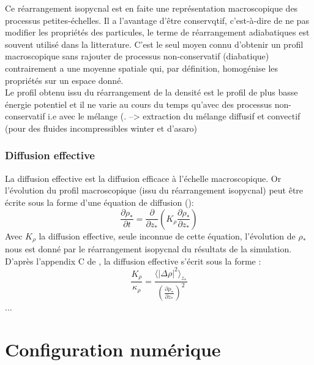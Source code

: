 \documentclass[a4paper,12pt]{article}
\begin{document}
        Ce réarrangement isopycnal est en faite une représentation macroscopique des processus petites-échelles. Il a l'avantage d'être conservqtif, c'est-à-dire de ne pas modifier les propriétés des particules, le terme de réarrangement adiabatiques est souvent utilisé dans la litterature. C'est le seul moyen connu d'obtenir un profil macroscopique sans rajouter de processus non-conservatif (diabatique) contrairement a une moyenne spatiale qui, par définition, homogénise les propriétés sur un espace donné. \\
        Le profil obtenu issu du réarrangement de la densité est le profil de plus basse énergie potentiel et il ne varie au cours du temps qu'avec des processus non-conservatif i.e avec le mélange (\cite*{winters_diascalar_1996}. --> extraction du mélange diffusif et convectif (pour des fluides incompressibles winter et d'asaro)
        
        
        \subsubsection{Diffusion effective}
        
        La diffusion effective est la diffusion efficace à l'échelle macroscopique. Or l'évolution du profil macroscopique (issu du réarrangement isopycnal) peut être écrite sous la forme d'une équation de diffusion (\citep{penney_diapycnal_2020-1}): 
        \begin{equation}
            \label{rho*}
            \frac{\partial\rho_*}{\partial t}=\frac{\partial}{\partial z_*}(K_{\rho}\frac{\partial\rho_*}{\partial z_*})
        \end{equation}
        Avec $K_{\rho}$ la diffusion effective, seule inconnue de cette équation, l'évolution de $\rho_*$ nous est donné par le réarrangement isopycnal du résultats de la simulation. D'après l'appendix C de \citep{penney_diapycnal_2020-1}, la diffusion effective s'écrit sous la forme :
        \begin{equation}
            \label{Keff}
            \frac{K_{\rho}}{\kappa_{\rho}}=\frac{\langle\vert\Delta\rho\vert^2\rangle_{z_*}}{(\frac{\partial\rho_*}{\partial z_*})^2}
        \end{equation}
         ...
        
        
\section{Configuration numérique}
    
\end{document}

